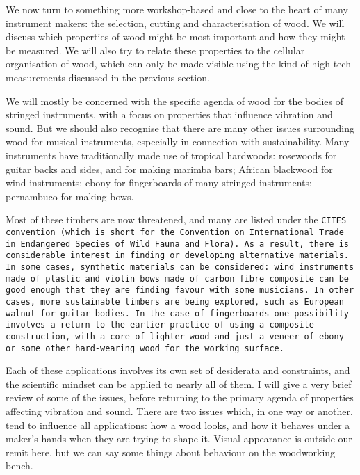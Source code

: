 

  We now turn to something more workshop-based and close to the heart of many 
  instrument makers: the selection, cutting and characterisation of wood. We 
  will discuss which properties of wood might be most important and how they 
  might be measured. We will also try to relate these properties to the 
  cellular organisation of wood, which can only be made visible using the kind 
  of high-tech measurements discussed in the previous section. 

  We will mostly be concerned with the specific agenda of wood for the bodies 
  of stringed instruments, with a focus on properties that influence vibration 
  and sound. But we should also recognise that there are many other issues 
  surrounding wood for musical instruments, especially in connection with 
  sustainability. Many instruments have traditionally made use of tropical 
  hardwoods: rosewoods for guitar backs and sides, and for making marimba bars; 
  African blackwood for wind instruments; ebony for fingerboards of many 
  stringed instruments; pernambuco for making bows. 

  Most of these timbers are now threatened, and many are listed under the 
  \tt{}CITES convention\rm{} (which is short for the Convention on 
  International Trade in Endangered Species of Wild Fauna and Flora). As a 
  result, there is considerable interest in finding or developing alternative 
  materials. In some cases, synthetic materials can be considered: wind 
  instruments made of plastic and violin bows made of carbon fibre composite 
  can be good enough that they are finding favour with some musicians. In other 
  cases, more sustainable timbers are being explored, such as European walnut 
  for guitar bodies. In the case of fingerboards one possibility involves a 
  return to the earlier practice of using a composite construction, with a core 
  of lighter wood and just a veneer of ebony or some other hard-wearing wood 
  for the working surface. 

  Each of these applications involves its own set of desiderata and 
  constraints, and the scientific mindset can be applied to nearly all of them. 
  I will give a very brief review of some of the issues, before returning to 
  the primary agenda of properties affecting vibration and sound. There are two 
  issues which, in one way or another, tend to influence all applications: how 
  a wood looks, and how it behaves under a maker’s hands when they are trying 
  to shape it. Visual appearance is outside our remit here, but we can say some 
  things about behaviour on the woodworking bench. 

